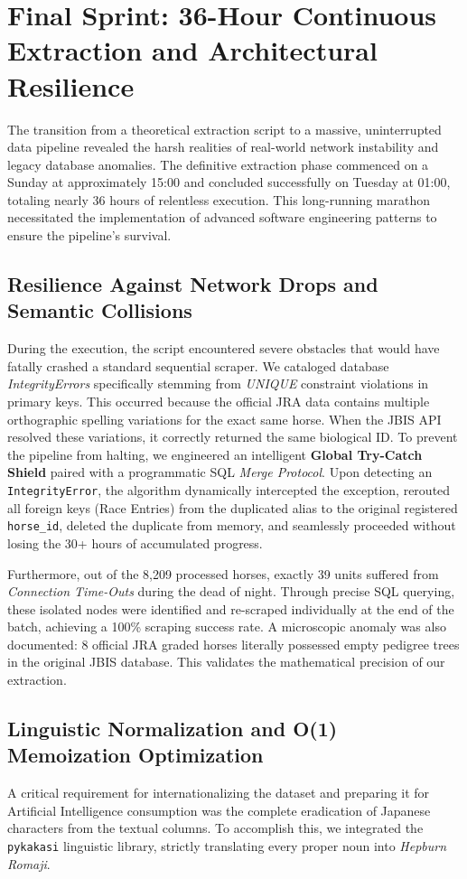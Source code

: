 \documentclass[12pt,a4paper]{article}
\begin{document}
\section{Final Sprint: 36-Hour Continuous Extraction and Architectural Resilience}

The transition from a theoretical extraction script to a massive, uninterrupted data pipeline revealed the harsh realities of real-world network instability and legacy database anomalies. The definitive extraction phase commenced on a Sunday at approximately 15:00 and concluded successfully on Tuesday at 01:00, totaling nearly 36 hours of relentless execution. This long-running marathon necessitated the implementation of advanced software engineering patterns to ensure the pipeline's survival.

\subsection{Resilience Against Network Drops and Semantic Collisions}
During the execution, the script encountered severe obstacles that would have fatally crashed a standard sequential scraper. We cataloged database \textit{IntegrityErrors} specifically stemming from \textit{UNIQUE} constraint violations in primary keys. This occurred because the official JRA data contains multiple orthographic spelling variations for the exact same horse. When the JBIS API resolved these variations, it correctly returned the same biological ID. To prevent the pipeline from halting, we engineered an intelligent \textbf{Global Try-Catch Shield} paired with a programmatic SQL \textit{Merge Protocol}. Upon detecting an \texttt{IntegrityError}, the algorithm dynamically intercepted the exception, rerouted all foreign keys (Race Entries) from the duplicated alias to the original registered \texttt{horse\_id}, deleted the duplicate from memory, and seamlessly proceeded without losing the 30+ hours of accumulated progress.

Furthermore, out of the 8,209 processed horses, exactly 39 units suffered from \textit{Connection Time-Outs} during the dead of night. Through precise SQL querying, these isolated nodes were identified and re-scraped individually at the end of the batch, achieving a 100\% scraping success rate. A microscopic anomaly was also documented: 8 official JRA graded horses literally possessed empty pedigree trees in the original JBIS database. This validates the mathematical precision of our extraction.

\subsection{Linguistic Normalization and O(1) Memoization Optimization}
A critical requirement for internationalizing the dataset and preparing it for Artificial Intelligence consumption was the complete eradication of Japanese characters from the textual columns. To accomplish this, we integrated the \texttt{pykakasi} linguistic library, strictly translating every proper noun into \textit{Hepburn Romaji}.
\end{document}
